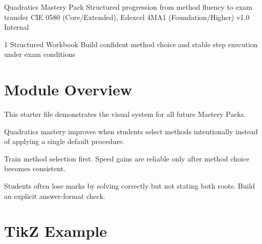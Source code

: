 \documentclass[11pt,a4paper]{article}
\begin{document}

\MasteryPackCover
  {Quadratics Mastery Pack}
  {Structured progression from method fluency to exam transfer}
  {CIE 0580 (Core/Extended), Edexcel 4MA1 (Foundation/Higher)}
  {v1.0 Internal}

\MasteryTOCPage

\MasteryModuleCover
  {1}
  {Structured Workbook}
  {Build confident method choice and stable step execution under exam conditions}

\tableofcontents

\section{Module Overview}
This starter file demonstrates the visual system for all future Mastery Packs.

\begin{keyconceptbox}
Quadratics mastery improves when students select methods intentionally instead of applying a single default procedure.
\end{keyconceptbox}

\begin{examtipbox}
Train method selection first. Speed gains are reliable only after method choice becomes consistent.
\end{examtipbox}

\begin{commonmistakebox}
Students often lose marks by solving correctly but not stating both roots. Build an explicit answer-format check.
\end{commonmistakebox}

\section{TikZ Example}
\MasteryTikzRules

\begin{center}
\end{center}
\end{document}
